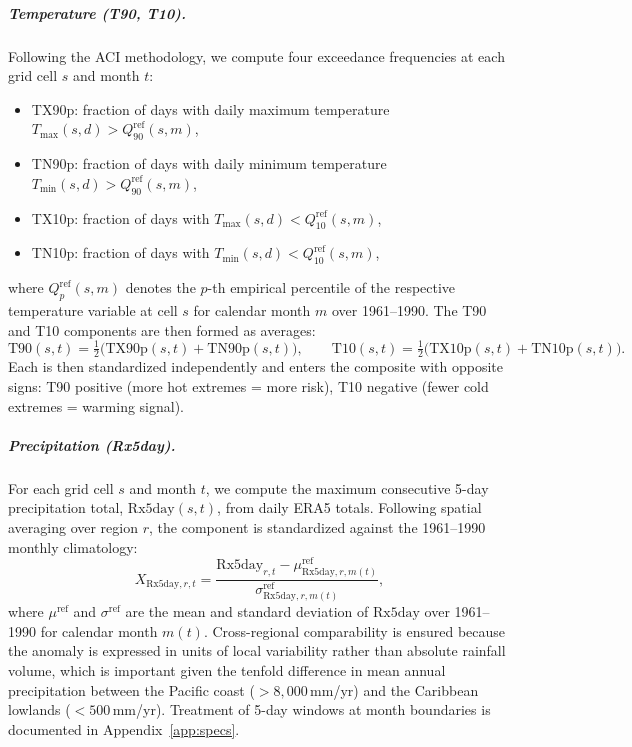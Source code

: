 \documentclass[12pt]{article}
\begin{document}
\subparagraph{Temperature (T90, T10).} Following the ACI methodology, we compute four exceedance frequencies at each grid cell $s$ and month $t$:
\begin{itemize}
\item TX90p: fraction of days with daily maximum temperature $T_{\max}(s,d) > Q_{90}^{\mathrm{ref}}(s,m)$,
\item TN90p: fraction of days with daily minimum temperature $T_{\min}(s,d) > Q_{90}^{\mathrm{ref}}(s,m)$,
\item TX10p: fraction of days with $T_{\max}(s,d) < Q_{10}^{\mathrm{ref}}(s,m)$,
\item TN10p: fraction of days with $T_{\min}(s,d) < Q_{10}^{\mathrm{ref}}(s,m)$,
\end{itemize}
where $Q_p^{\mathrm{ref}}(s,m)$ denotes the $p$-th empirical percentile of the respective temperature variable at cell $s$ for calendar month $m$ over 1961--1990. The T90 and T10 components are then formed as averages:
\begin{equation}\label{eq:T90_avg}
\mathrm{T90}(s,t) = \tfrac{1}{2}\big(\mathrm{TX90p}(s,t) + \mathrm{TN90p}(s,t)\big),\qquad
\mathrm{T10}(s,t) = \tfrac{1}{2}\big(\mathrm{TX10p}(s,t) + \mathrm{TN10p}(s,t)\big).
\end{equation}
Each is then standardized independently and enters the composite with opposite signs: T90 positive (more hot extremes = more risk), T10 negative (fewer cold extremes = warming signal).

\subparagraph{Precipitation (Rx5day).} For each grid cell $s$ and month $t$, we compute the maximum consecutive 5-day precipitation total, $\mathrm{Rx5day}(s,t)$, from daily ERA5 totals. Following spatial averaging over region $r$, the component is standardized against the 1961--1990 monthly climatology:
\begin{equation}\label{eq:rx5day_zscore}
X_{\mathrm{Rx5day},r,t} = \frac{\mathrm{Rx5day}_{r,t} - \mu^{\mathrm{ref}}_{\mathrm{Rx5day},r,m(t)}}{\sigma^{\mathrm{ref}}_{\mathrm{Rx5day},r,m(t)}},
\end{equation}
where $\mu^{\mathrm{ref}}$ and $\sigma^{\mathrm{ref}}$ are the mean and standard deviation of $\mathrm{Rx5day}$ over 1961--1990 for calendar month $m(t)$. Cross-regional comparability is ensured because the anomaly is expressed in units of local variability rather than absolute rainfall volume, which is important given the tenfold difference in mean annual precipitation between the Pacific coast ($>8{,}000$\,mm/yr) and the Caribbean lowlands ($<500$\,mm/yr). Treatment of 5-day windows at month boundaries is documented in Appendix~\ref{app:specs}.
\end{document}
